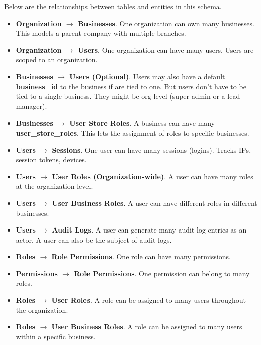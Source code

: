\documentclass[]{VUMIFTemplateClass}
\begin{document}
Below are the relationships between tables and entities in this schema.
\begin{itemize}
    \item \textbf{Organization $\rightarrow$ Businesses}. One organization can own many businesses. This models a parent company with multiple branches.
    \item \textbf{Organization $\rightarrow$ Users}. One organization can have many users. Users are scoped to an organization.
    \item \textbf{Businesses $\rightarrow$ Users (Optional)}. Users may also have a default \textbf{business\_id} to the business if are tied to one. But users don't have to be tied to a single business. They might be org-level (super admin or a lead manager).
    \item \textbf{Businesses $\rightarrow$ User Store Roles}. A business can have many \textbf{user\_store\_roles}. This lets the assignment of roles to specific businesses.
    \item \textbf{Users $\rightarrow$ Sessions}. One user can have many sessions (logins). Tracks IPs, session tokens, devices.
    \item \textbf{Users $\rightarrow$ User Roles (Organization-wide)}. A user can have many roles at the organization level.
    \item \textbf{Users $\rightarrow$ User Business Roles}. A user can have different roles in different businesses.
    \item \textbf{Users $\rightarrow$ Audit Logs}. A user can generate many audit log entries as an actor. A user can also be the subject of audit logs.
    \item \textbf{Roles $\rightarrow$ Role Permissions}. One role can have many permissions.
    \item \textbf{Permissions $\rightarrow$ Role Permissions}. One permission can belong to many roles.
    \item \textbf{Roles $\rightarrow$ User Roles}. A role can be assigned to many users throughout the organization.
    \item \textbf{Roles $\rightarrow$ User Business Roles}. A role can be assigned to many users within a specific business.
\end{itemize}
\end{document}
